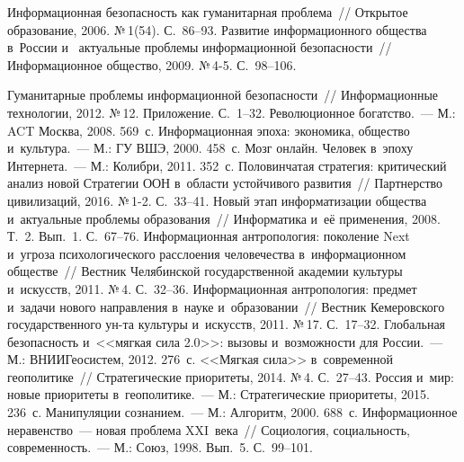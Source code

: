 \begin{multicols}{2}
{\small\frenchspacing
 {%
 \begin{thebibliography}{99}
 Информационная безопасность как гуманитарная проб\-ле\-ма~// 
Открытое образование, 2006. №\,1(54). С.~86--93.
 Развитие информационного общества в~России и~
актуальные проблемы информационной безопасности~// Информационное общество, 
2009. №\,4-5. С.~98--106.

 Гуманитарные проблемы информационной безопасности~// 
Информационные технологии, 2012. №\,12. Приложение. С.~1--32.
 Революционное богатство.~--- М.: ACT Москва, 2008. 569~с.
 Информационная эпоха: экономика, общество и~культура.~--- М.: 
ГУ ВШЭ, 2000. 458~с.
 Мозг онлайн. Человек в~эпоху Интернета.~--- М.: Колибри, 
2011. 352~с.
 Половинчатая стратегия: критический анализ новой Стратегии ООН 
в~об\-ласти устойчивого развития~// Партнерство цивилизаций, 2016. №\,1-2.  
С.~33--41.
 Новый этап информатизации общества и~актуальные 
проблемы образования~// Информатика и~её применения, 2008. Т.~2. Вып.~1.  
С.~67--76.
 Информационная антропология: поколение Next и~угроза 
психологического расслоения человечества в~информационном обществе~// Вестник 
Челябинской государственной академии культуры и~искусств, 2011. №\,4. С.~32--36.
 Информационная антропология: предмет и~задачи нового 
направления в~науке и~образовании~// Вестник Кемеровского государственного ун-та 
культуры и~искусств, 2011. №\,17. С.~17--32.
 Глобальная безопасность и~<<мягкая сила 
2.0>>: вызовы и~возможности для России.~--- М.: ВНИИГеосистем, 2012. 276~с.
 <<Мягкая сила>> в~современной геополитике~// Стратегические 
приоритеты, 2014. №\,4. С.~27--43.
 Россия и~мир: новые приоритеты в~геополитике.~--- М.: 
Стратегические приоритеты, 2015. 236~с.
 Манипуляции сознанием.~--- М.: Алгоритм, 2000. 688~с.
 Информационное неравенство~--- новая проблема XXI~века~// 
Социология, социальность, современность.~--- М.: Союз, 1998. Вып.~5. 
С.~99--101.


\end{thebibliography}}}
\end{multicols}
